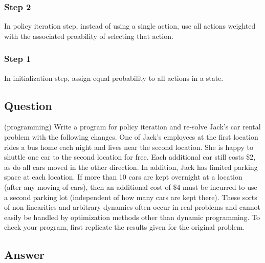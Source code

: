\documentclass[11pt]{article}
\begin{document}
    \subsubsection*{Step 2}

    In policy iteration step, instead of using a single action, use all actions weighted with the associated proability of selecting that action.

    \subsubsection*{Step 1}

    In initialization step, assign equal probability to all actions in a state.

    \subsection{Question}

    (programming) Write a program for policy iteration and re-solve Jack’s car rental problem with the following changes.
    One of Jack’s employees at the first location rides a bus home each night and lives near the second location.
    She is happy to shuttle one car to the second location for free.
    Each additional car still costs \$2, as do all cars moved in the other direction.
    In addition, Jack has limited parking space at each location.
    If more than 10 cars are kept overnight at a location (after any moving of cars), then an additional cost of \$4 must be incurred to use a second parking lot (independent of how many cars are kept there).
    These sorts of non-linearities and arbitrary dynamics often occur in real problems and cannot easily be handled by optimization methods other than dynamic programming.
    To check your program, first replicate the results given for the original problem.

    \subsection*{Answer}
\end{document}
